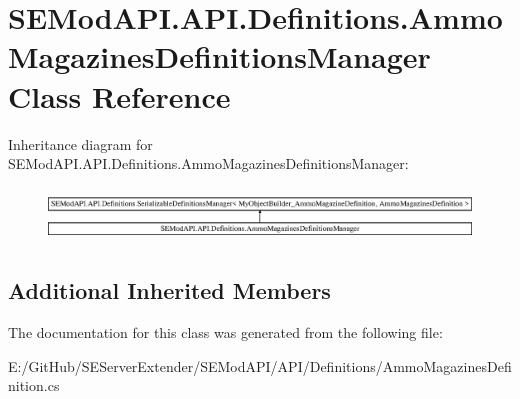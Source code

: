 \hypertarget{class_s_e_mod_a_p_i_1_1_a_p_i_1_1_definitions_1_1_ammo_magazines_definitions_manager}{}\section{S\+E\+Mod\+A\+P\+I.\+A\+P\+I.\+Definitions.\+Ammo\+Magazines\+Definitions\+Manager Class Reference}
\label{class_s_e_mod_a_p_i_1_1_a_p_i_1_1_definitions_1_1_ammo_magazines_definitions_manager}
Inheritance diagram for S\+E\+Mod\+A\+P\+I.\+A\+P\+I.\+Definitions.\+Ammo\+Magazines\+Definitions\+Manager\+:\begin{figure}[H]
\begin{center}
\leavevmode
\includegraphics[height=1.448900cm]{class_s_e_mod_a_p_i_1_1_a_p_i_1_1_definitions_1_1_ammo_magazines_definitions_manager}
\end{center}
\end{figure}
\subsection*{Additional Inherited Members}


The documentation for this class was generated from the following file\+:\begin{DoxyCompactItemize}
\item 
E\+:/\+Git\+Hub/\+S\+E\+Server\+Extender/\+S\+E\+Mod\+A\+P\+I/\+A\+P\+I/\+Definitions/Ammo\+Magazines\+Definition.\+cs\end{DoxyCompactItemize}
